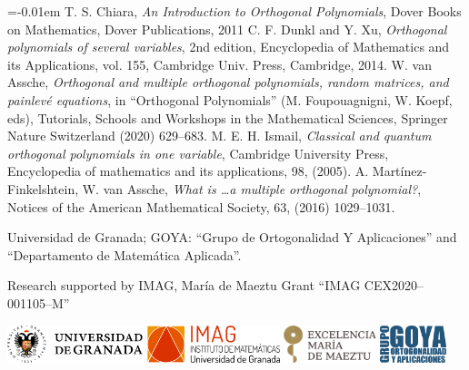 \documentclass[portrait,final,a0paper,fontscale=0.38]{baposter}
\begin{document}
\begin{poster}
{\smaller

\renewcommand{\section}[2]{\vskip 0.05em}
\begin{thebibliography}{1}\itemsep=-0.01em
\setlength{\baselineskip}{0.4em}
{\sc T. S. Chiara},
{\em An Introduction to Orthogonal Polynomials},
{\rm Dover Books on Mathematics, Dover Publications, 2011}
{\sc C. F. Dunkl and Y. Xu},
{\em Orthogonal polynomials of several variables},
{\rm 2nd edition, Encyclopedia of Mathematics and its Applications, vol. 155, Cambridge Univ. Press, Cambridge, 2014.}
{\sc W. van Assche},
{\em Orthogonal and multiple orthogonal polynomials, random matrices, and painlevé equations}, in 
{\rm ``Orthogonal Polynomials'' (M. Foupouagnigni, W. Koepf, eds), Tutorials, Schools and Workshops in the Mathematical Sciences, Springer Nature Switzerland} (2020) 629--683.
{\sc M. E. H. Ismail},
{\em Classical and quantum orthogonal polynomials in one variable},
{\rm Cambridge University Press, Encyclopedia of mathematics and its applications}, 98, (2005).
{\sc A. Martínez-Finkelshtein, W. van Assche},
{\em What is \dots a multiple orthogonal polynomial?},
{\rm Notices of the American Mathematical Society}, 63, (2016) 1029--1031.
\end{thebibliography}



{\noindent\hspace*{-5pt}
 Universidad de Granada; GOYA: ``Grupo de Ortogonalidad Y Aplicaciones'' and ``Departamento de Matemática Aplicada''.}

\noindent Research supported by IMAG, María de Maeztu Grant ``IMAG CEX2020--001105--M''
\bigskip
\vspace{1pt}
\centerline{
\includegraphics[height=1.1cm]{ugrH} \quad
\includegraphics[height=1.1cm]{IMAG} \quad
\includegraphics[height=1.1cm]{maeztu} \quad
\includegraphics[height=1.1cm]{goya.png}
}

}
\end{poster}
\end{document}
